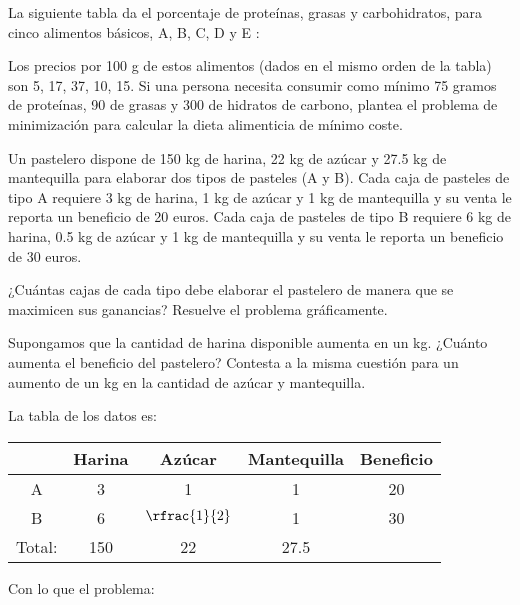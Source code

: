 \begin{problem}[3]

La siguiente tabla da el porcentaje de proteínas, grasas y carbohidratos, para cinco alimentos
básicos, A, B, C, D y E :


Los precios por 100 g de estos alimentos (dados en el mismo orden de la tabla) son 5, 17, 37, 10,
15. Si una persona necesita consumir como mínimo 75 gramos de proteínas, 90 de grasas y 300 de
hidratos de carbono, plantea el problema de minimización para calcular la dieta alimenticia de mínimo coste.
\solution


\end{problem}


\begin{problem}[5]

Un pastelero dispone de 150 kg de harina, 22 kg de azúcar y 27.5 kg de mantequilla para elaborar
dos tipos de pasteles (A y B). Cada caja de pasteles de tipo A requiere 3 kg de harina, 1 kg de azúcar
y 1 kg de mantequilla y su venta le reporta un beneficio de 20 euros. Cada caja de pasteles de tipo
B requiere 6 kg de harina, 0.5 kg de azúcar y 1 kg de mantequilla y su venta le reporta un beneficio
de 30 euros.

\ppart ¿Cuántas cajas de cada tipo debe elaborar el pastelero de manera que se maximicen sus
ganancias? Resuelve el problema gráficamente.

\ppart Supongamos que la cantidad de harina disponible aumenta en un kg. ¿Cuánto aumenta
el beneficio del pastelero? Contesta a la misma cuestión para un aumento de un kg en la
cantidad de azúcar y mantequilla.

\label{ejer:pastelero}

\solution

La tabla de los datos es:
\begin{table}[hbtp]
\centering

\begin{tabular}{ccccc}
&Harina&Azúcar&Mantequilla&Beneficio\\\hline
A&3&1&1&20\\
B&6&$\rfrac{1}{2}$&1&30\\\hline
Total:&150&22&27.5&
\end{tabular}
\end{table}

Con lo que el problema:

\begin{ioprob}
\end{ioprob}


\end{problem}
